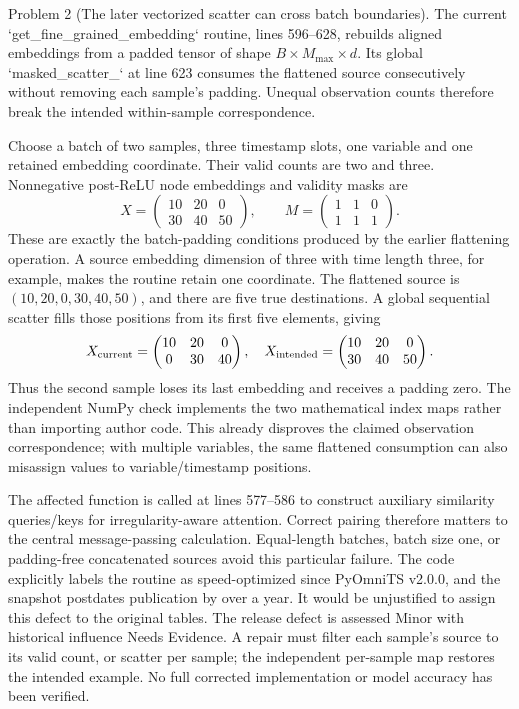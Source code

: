 \documentclass[10pt]{article}
\begin{document}
Problem 2 (The later vectorized scatter can cross batch boundaries).  The current `get\_fine\_grained\_embedding` routine, lines 596–628, rebuilds aligned embeddings from a padded tensor of shape \(B\times M_{\max}\times d\). Its global `masked\_scatter\_` at line 623 consumes the flattened source consecutively without removing each sample’s padding. Unequal observation counts therefore break the intended within-sample correspondence.\par
Choose a batch of two samples, three timestamp slots, one variable and one retained embedding coordinate. Their valid counts are two and three. Nonnegative post-ReLU node embeddings and validity masks are \[X=\begin{pmatrix}10&20&0\\30&40&50\end{pmatrix},\qquad
M=\begin{pmatrix}1&1&0\\1&1&1\end{pmatrix}.\] These are exactly the batch-padding conditions produced by the earlier flattening operation. A source embedding dimension of three with time length three, for example, makes the routine retain one coordinate. The flattened source is \((10,20,0,30,40,50)\), and there are five true destinations. A global sequential scatter fills those positions from its first five elements, giving \[X_{\rm current}=\begin{pmatrix}10&20&0\\0&30&40\end{pmatrix},
\quad X_{\rm intended}=\begin{pmatrix}10&20&0\\30&40&50\end{pmatrix}.\] Thus the second sample loses its last embedding and receives a padding zero. The independent NumPy check implements the two mathematical index maps rather than importing author code. This already disproves the claimed observation correspondence; with multiple variables, the same flattened consumption can also misassign values to variable/timestamp positions.\par
The affected function is called at lines 577–586 to construct auxiliary similarity queries/keys for irregularity-aware attention. Correct pairing therefore matters to the central message-passing calculation. Equal-length batches, batch size one, or padding-free concatenated sources avoid this particular failure. The code explicitly labels the routine as speed-optimized since PyOmniTS v2.0.0, and the snapshot postdates publication by over a year. It would be unjustified to assign this defect to the original tables. The release defect is assessed Minor with historical influence Needs Evidence. A repair must filter each sample’s source to its valid count, or scatter per sample; the independent per-sample map restores the intended example. No full corrected implementation or model accuracy has been verified.\par
\end{document}
